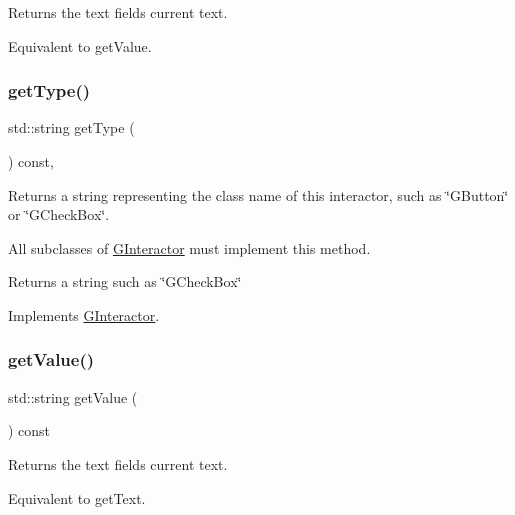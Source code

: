 Returns the text field\textquotesingle{}s current text. 

Equivalent to get\+Value. \mbox{\label{classGTextField_a9b72ede4ee8520f987a0c01e30654814}} 
\subsubsection{\texorpdfstring{get\+Type()}{getType()}}
{\footnotesize\ttfamily std\+::string get\+Type (\begin{DoxyParamCaption}{ }\end{DoxyParamCaption}) const\hspace{0.3cm}{\ttfamily [override]}, {\ttfamily [virtual]}}



Returns a string representing the class name of this interactor, such as \char`\"{}\+G\+Button\char`\"{} or \char`\"{}\+G\+Check\+Box\char`\"{}. 

All subclasses of \mbox{\hyperlink{classGInteractor}{G\+Interactor}} must implement this method. \begin{DoxyReturn}{Returns}
a string such as \char`\"{}\+G\+Check\+Box\char`\"{} 
\end{DoxyReturn}


Implements \mbox{\hyperlink{classGInteractor_a44c407a54a20dd0f2fff30338289299d}{G\+Interactor}}.

\mbox{\label{classGTextField_a2a03038d2e299f486e55dc72778f7086}} 
\subsubsection{\texorpdfstring{get\+Value()}{getValue()}}
{\footnotesize\ttfamily std\+::string get\+Value (\begin{DoxyParamCaption}{ }\end{DoxyParamCaption}) const\hspace{0.3cm}{\ttfamily [virtual]}}



Returns the text field\textquotesingle{}s current text. 

Equivalent to get\+Text. \mbox{\label{classGTextField_a8190c918ce29007223898c9d511b17ee}} 
